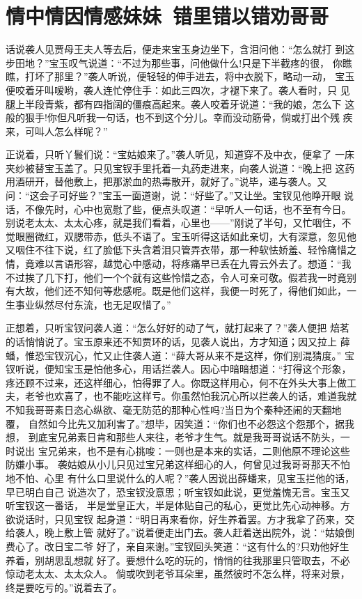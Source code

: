 \chapter{情中情因情感妹妹~错里错以错劝哥哥}

话说袭人见贾母王夫人等去后，便走来宝玉身边坐下，含泪问他：“怎么就打
到这步田地？”宝玉叹气说道：“不过为那些事，问他做什么!只是下半截疼的很，
你瞧瞧，打坏了那里？”袭人听说，便轻轻的伸手进去，将中衣脱下，略动一动，
宝玉便咬着牙叫嗳哟，袭人连忙停住手：如此三四次，才褪下来了。袭人看时，只
见腿上半段青紫，都有四指阔的僵痕高起来。袭人咬着牙说道：“我的娘，怎么下
这般的狠手!你但凡听我一句话，也不到这个分儿。幸而没动筋骨，倘或打出个残
疾来，可叫人怎么样呢？”

正说着，只听丫鬟们说：“宝姑娘来了。”袭人听见，知道穿不及中衣，便拿了
一床夹纱被替宝玉盖了。只见宝钗手里托着一丸药走进来，向袭人说道：“晚上把
这药用酒研开，替他敷上，把那淤血的热毒散开，就好了。”说毕，递与袭人。又
问：“这会子可好些？”宝玉一面道谢，说：“好些了。”又让坐。宝钗见他睁开眼
说话，不像先时，心中也宽慰了些，便点头叹道：“早听人一句话，也不至有今日。
别说老太太、太太心疼，就是我们看着，心里也——”刚说了半句，又忙咽住，不
觉眼圈微红，双腮带赤，低头不语了。宝玉听得这话如此亲切，大有深意，忽见他
又咽住不往下说，红了脸低下头含着泪只管弄衣带，那一种软怯娇羞、轻怜痛惜之
情，竟难以言语形容，越觉心中感动，将疼痛早已丢在九霄云外去了。想道：“我
不过挨了几下打，他们一个个就有这些怜惜之态，令人可亲可敬。假若我一时竟别
有大故，他们还不知何等悲感呢。既是他们这样，我便一时死了，得他们如此，一
生事业纵然尽付东流，也无足叹惜了。”

正想着，只听宝钗问袭人道：“怎么好好的动了气，就打起来了？”袭人便把
焙茗的话悄悄说了。宝玉原来还不知贾环的话，见袭人说出，方才知道；因又拉上
薛蟠，惟恐宝钗沉心，忙又止住袭人道：“薛大哥从来不是这样，你们别混猜度。”
宝钗听说，便知宝玉是怕他多心，用话拦袭人。因心中暗暗想道：“打得这个形象，
疼还顾不过来，还这样细心，怕得罪了人。你既这样用心，何不在外头大事上做工
夫，老爷也欢喜了，也不能吃这样亏。你虽然怕我沉心所以拦袭人的话，难道我就
不知我哥哥素日恣心纵欲、毫无防范的那种心性吗?当日为个秦种还闹的天翻地覆，
自然如今比先又加利害了。”想毕，因笑道：“你们也不必怨这个怨那个，据我想，
到底宝兄弟素日肯和那些人来往，老爷才生气。就是我哥哥说话不防头，一时说出
宝兄弟来，也不是有心挑唆：一则也是本来的实话，二则他原不理论这些防嫌小事。
袭姑娘从小儿只见过宝兄弟这样细心的人，何曾见过我哥哥那天不怕地不怕、心里
有什么口里说什么的人呢？”袭人因说出薛蟠来，见宝玉拦他的话，早已明白自己
说造次了，恐宝钗没意思；听宝钗如此说，更觉羞愧无言。宝玉又听宝钗这一番话，
半是堂皇正大，半是体贴自己的私心，更觉比先心动神移。方欲说话时，只见宝钗
起身道：“明日再来看你，好生养着罢。方才我拿了药来，交给袭人，晚上敷上管
就好了。”说着便走出门去。袭人赶着送出院外，说：“姑娘倒费心了。改日宝二爷
好了，亲自来谢。”宝钗回头笑道：“这有什么的?只劝他好生养着，别胡思乱想就
好了。要想什么吃的玩的，悄悄的往我那里只管取去，不必惊动老太太、太太众人。
倘或吹到老爷耳朵里，虽然彼时不怎么样，将来对景，终是要吃亏的。”说着去了。

